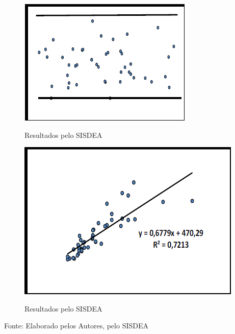 \begin{minipage}[t!]{0.5\textwidth}
	\begin{figure}[H]
		\centering  \small 		\caption{ Resultados pelo SISDEA}
		\includegraphics[width=0.93947\linewidth]{figura/screenshot036}
		\label{fig:screenshot036}
	\end{figure}
\end{minipage}\hfill
\begin{minipage}[t!]{0.5\textwidth}
	\begin{figure}[H]
		\centering  \small 		\caption{ Resultados pelo SISDEA}
		\includegraphics[width=0.93947\linewidth]{figura/screenshot035}
		\label{fig:screenshot035}
	\end{figure}
\end{minipage} 
\begin{center}
	Fonte: Elaborado pelos Autores, pelo SISDEA
\end{center}





